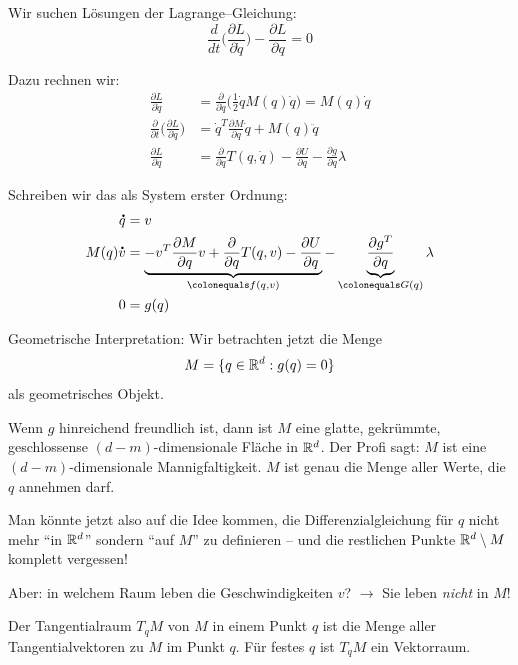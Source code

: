 Wir suchen Lösungen der Lagrange--Gleichung:
\begin{equation*}
	\frac{d}{dt}\Bigg(\frac{\partial L}{\partial \dot{q}}\Bigg) -  \frac{\partial L}{\partial q} = 0
\end{equation*}

Dazu rechnen wir:
\begin{align*}
	\frac{\partial L}{\partial \dot{q}} & = \frac{\partial}{\partial \dot{q}}\Bigg( \frac{1}{2}  \dot{q} M(q) \dot{q} \Bigg) = M(q) \dot{q}
	\\
	\frac{\partial}{\partial t} \Bigg(\frac{\partial L}{\partial \dot{q}}\Bigg) & = \dot{q}^T\frac{\partial M}{\partial q} \dot{q} + M(q) \ddot{q}
	\\
	\frac{\partial L}{\partial q} & = \frac{\partial }{\partial q} T(q,\dot{q}) - \frac{\partial U}{\partial q} - \frac{\partial g}{\partial q} \lambda
\end{align*}

Schreiben wir das als System erster Ordnung:
\begin{align*}
	\dot{q} & = v
	\\
	M(q) \dot{v} & = \underbrace{-v^T\frac{\partial M}{\partial q} v + \frac{\partial }{\partial q} T(q,v) - \frac{\partial U}{\partial q}}_{\colonequals f(q,v)} - \underbrace{\frac{\partial g^T}{\partial q}}_{\colonequals G(q)} \lambda
	\\
	0 & = g(q)
\end{align*}

Geometrische Interpretation:
Wir betrachten jetzt die Menge
\begin{equation*}
	M = \{q \in \mathbb R^d : g(q) = 0 \}
\end{equation*}
als geometrisches Objekt.

Wenn $g$ hinreichend freundlich ist, dann ist $M$ eine glatte, gekrümmte, geschlossense $(d-m)$-dimensionale Fläche in $\mathbb R^d$. Der Profi sagt: $M$ ist eine $(d-m)$-dimensionale Mannigfaltigkeit. $M$ ist genau die Menge aller Werte, die $q$ annehmen darf.

Man könnte jetzt also auf die Idee kommen, die Differenzialgleichung für $q$ nicht mehr \enquote{in $\mathbb R^d$} sondern \enquote{auf $M$} zu definieren -- und die restlichen Punkte $\mathbb R^d \setminus M$ komplett vergessen!

Aber: in welchem Raum leben die Geschwindigkeiten $v$? $\to$ Sie leben \emph{nicht} in $M$!

\begin{definition}
	Der Tangentialraum $T_q M$ von $M$ in einem Punkt $q$ ist die Menge aller Tangentialvektoren zu $M$ im Punkt $q$. Für festes $q$ ist $T_q M$ ein Vektorraum.
\end{definition}

